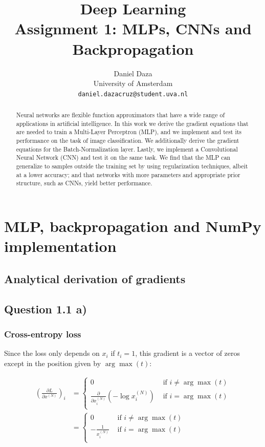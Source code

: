 \documentclass{article}
\title{Deep Learning\\Assignment 1: MLPs, CNNs and Backpropagation}
\author{%
  Daniel Daza\\
  University of Amsterdam\\
  \texttt{daniel.dazacruz@student.uva.nl} \\
}
\begin{document}

\maketitle

\begin{abstract}
Neural networks are flexible function approximators that have a wide range of applications in artificial intelligence. In this work we derive the gradient equations that are needed to train a Multi-Layer Perceptron (MLP), and we implement and test its performance on the task of image classification. We additionally derive the gradient equations for the Batch-Normalization layer. Lastly, we implement a Convolutional Neural Network (CNN) and test it on the same task. We find that the MLP can generalize to samples outside the training set by using regularization techniques, albeit at a lower accuracy; and that networks with more parameters and appropriate prior structure, such as CNNs, yield better performance.
\end{abstract}

\section{MLP, backpropagation and NumPy implementation}

\subsection{Analytical derivation of gradients}

\subsection*{Question 1.1 a)}

\subsubsection*{Cross-entropy loss}

Since the loss only depends on $x_i$ if $t_i = 1$, this gradient is a vector of zeros except in the position given by $\arg\max(t)$:

\begin{align}
\left(\frac{\partial L}{\partial x^{(N)}} \right)_i &=
\left\lbrace
\begin{matrix}
0 &\text{ if } i \neq \arg\max(t)\\
\frac{\partial}{\partial x_i^{(N)}}\left(-\log x_i^{(N)}\right) &\text{ if } i = \arg\max(t)\\
\end{matrix}
\right.\\
&= \left\lbrace
\begin{matrix}
0 &\text{ if } i \neq \arg\max(t)\\
-\frac{1}{x_i^{(N)}} &\text{ if } i = \arg\max(t)\\
\end{matrix}
\right.
\end{align}
\end{document}
